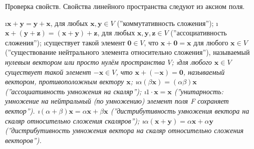 \begin{solution}
Проверка свойств. Свойства линейного пространства следуют из аксиом поля.

\begin{enumerate}
\i $\mathbf{x} + \mathbf{y} = \mathbf{y} + \mathbf{x}$, для любых $\mathbf{x}, \mathbf{y}\in V$ (''коммутативность сложения'');
\i $\mathbf{x} + (\mathbf{y} + \mathbf{z}) = (\mathbf{x} + \mathbf{y}) + \mathbf{z}$, для любых $\mathbf{x}, \mathbf{y}, \mathbf{z} \in V$ (''ассоциативность сложения'');
\i существует такой элемент $\mathbf{0} \in V$, что $\mathbf{x} + \mathbf{0} = \mathbf{x}$ для любого $\mathbf{x} \in V$ (''существование нейтрального элемента относительно сложения''), называемый \it{нулевым вектором} или просто \it{нулём} пространства $V$;
\i для любого $\mathbf{x} \in V$ существует такой элемент $-\mathbf{x} \in V$, что $\mathbf{x} + (-\mathbf{x}) = \mathbf{0}$, называемый вектором, \it{противоположным} вектору $\mathbf{x}$;
\i $\alpha(\beta\mathbf{x}) = (\alpha\beta)\mathbf{x}$ (''ассоциативность умножения на скаляр'');
\i $1\cdot\mathbf{x} = \mathbf{x}$ (''унитарность: умножение на нейтральный (по умножению) элемент поля F сохраняет вектор'').
\i $(\alpha + \beta)\mathbf{x} = \alpha \mathbf{x} + \beta \mathbf{x}$ (''дистрибутивность умножения вектора на скаляр относительно сложения скаляров'');
\i $\alpha(\mathbf{x} + \mathbf{y}) = \alpha \mathbf{x} + \alpha \mathbf{y}$(''дистрибутивность умножения вектора на скаляр относительно сложения векторов'').
\end{enumerate}
\end{solution}

